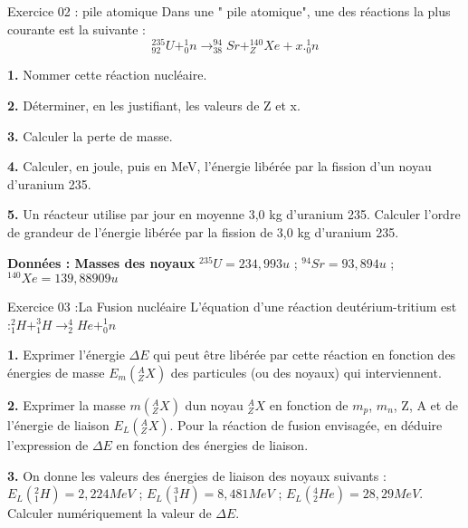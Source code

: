 \documentclass[12pt, french]{article}
\begin{document}
\begin{Box2}{Exercice 02 : pile atomique}
	Dans une " pile atomique", une des réactions la plus courante est la suivante :$$^{235}_{92}U + ^1_0n \rightarrow ^{94}_{38}Sr + ^{140}_{Z}Xe + x.^1_0n$$

	\textbf{1. }Nommer cette réaction nucléaire.

	\textbf{2. } Déterminer, en les justifiant, les valeurs de Z et x.
	
	\textbf{3. } Calculer la perte de masse.
	
	\textbf{4. } Calculer, en joule, puis en MeV, l'énergie libérée par la fission d'un noyau d'uranium 235.
	
	\textbf{5. } Un réacteur utilise par jour en moyenne 3,0 kg d'uranium 235.
Calculer l'ordre de grandeur de l'énergie libérée par la fission de 3,0 kg d'uranium 235.

\textbf{Données : Masses des noyaux } $^{235}U = 234,993u$ ; $^{94}Sr=93,894u$ ; $^{140}Xe = 139,88909u$
\end{Box2}


\begin{Box2}{Exercice 03 :La Fusion nucléaire}
	L’équation d’une réaction deutérium-tritium est :$^{2}_{1}H + ^3_1H \rightarrow ^{4}_{2}He + ^1_0n$

	\textbf{1. } Exprimer l'énergie $\Delta{E}$ qui peut être libérée par cette réaction en fonction des énergies de masse $E_m(^A_ZX)$ des particules (ou des noyaux) qui interviennent.

	\textbf{2. } Exprimer la masse $m(^A_ZX)$ dun noyau $^A_ZX$ en fonction de $m_p$, $m_n$, Z, A et de l'énergie de liaison $E_L(^A_ZX)$. Pour la réaction de fusion envisagée, en déduire l'expression de $\Delta{E}$ en fonction des
énergies de liaison.

\textbf{3. } On donne les valeurs des énergies de liaison des noyaux suivants :
$E_L(^2_1H) = 2,224MeV$ ; $E_L(^3_1H) = 8,481MeV$ ; $E_L(^4_2He) = 28,29MeV$. Calculer numériquement la valeur de $\Delta{E}$.
\end{Box2}
\end{document}

